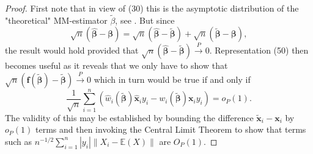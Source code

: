 \documentclass[11pt]{article}
\begin{document}
\begin{proof}
First note that in view of (30) this is the asymptotic distribution of the "theoretical" MM-estimator $\widetilde{\beta}$, see \citep{maronna2006robus
t}. But since
\begin{equation*}
\sqrt{n}(\widehat{\boldsymbol{\beta}} - \boldsymbol{\beta} ) = \sqrt{n}(\widehat{\boldsymbol{\beta}} - \widetilde{\boldsymbol{\beta}} ) + \sqrt{n}(\widetilde{\boldsymbol{\beta}} - \boldsymbol{\beta} ),
\end{equation*}
the result would hold provided that $\sqrt{n}(\widehat{\boldsymbol{\beta}} - \widetilde{\boldsymbol{\beta}} ) \xrightarrow{P} 0 $. Representation (50) then becomes useful as it reveals that we only have to show that $\sqrt{n} ( \mathbf{f}(\widetilde{\boldsymbol{\beta}}) - \widetilde{\boldsymbol{\beta}}) \xrightarrow{P} 0 $ which in turn would be true if and only if
\begin{equation*}
\frac{1}{\sqrt{n}}  \sum_{i=1}^n \left( \widehat{w}_i ( \boldsymbol{\widetilde{\beta}}) \mathbf{\widehat{x}}_i y_i - w_i ( \boldsymbol{\widetilde{\beta}}) \mathbf{x}_i y_i \right) = o_{P}(1).
\end{equation*}
The validity of this may be established by bounding the difference $\widetilde{\mathbf{x}}_i - \mathbf{x}_i $ by $o_{P}(1)$ terms and then invoking the Central Limit Theorem to show that terms such as $n^{-1/2} \sum_{i=1}^n |y_i| \left\|X_i - \mathbb{E}(X) \right\|$ are $O_{P}(1)$. 

\end{proof}

\fi
\newpage


\end{document}
